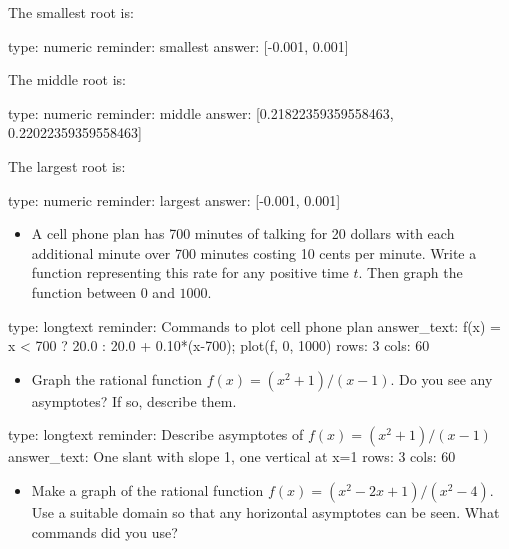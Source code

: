 \documentclass[12pt]{article}
\begin{document}
The smallest root is:

\begin{answer}
    type: numeric
    reminder: smallest
    answer: [-0.001, 0.001]

\end{answer}

The middle root is:

\begin{answer}
    type: numeric
    reminder: middle
    answer: [0.21822359359558463, 0.22022359359558463]

\end{answer}

The largest root is:

\begin{answer}
    type: numeric
    reminder: largest
    answer: [-0.001, 0.001]

\end{answer}

\begin{itemize}
\itemsep1pt\parskip0pt
\item
  A cell phone plan has 700 minutes of talking for 20 dollars with each
  additional minute over 700 minutes costing 10 cents per minute. Write
  a function representing this rate for any positive time $t$. Then
  graph the function between $0$ and $1000$.
\end{itemize}

\begin{answer}
type: longtext
reminder: Commands to plot cell phone plan
answer_text: f(x) = x < 700 ? 20.0  : 20.0 + 0.10*(x-700); plot(f, 0, 1000) 
rows: 3
cols: 60
\end{answer}

\begin{itemize}
\itemsep1pt\parskip0pt
\item
  Graph the rational function $f(x) = (x^2 + 1)/ (x - 1)$. Do you see
  any asymptotes? If so, describe them.
\end{itemize}

\begin{answer}
type: longtext
reminder: Describe asymptotes of \(f(x) = (x^2 + 1)/ (x - 1) \)
answer_text: One slant with slope 1, one vertical at x=1 
rows: 3
cols: 60
\end{answer}

\begin{itemize}
\itemsep1pt\parskip0pt
\item
  Make a graph of the rational function
  $f(x) = (x^2 - 2x + 1)/(x^2 -   4)$. Use a suitable domain so that any
  horizontal asymptotes can be seen. What commands did you use?
\end{itemize}
\end{document}
